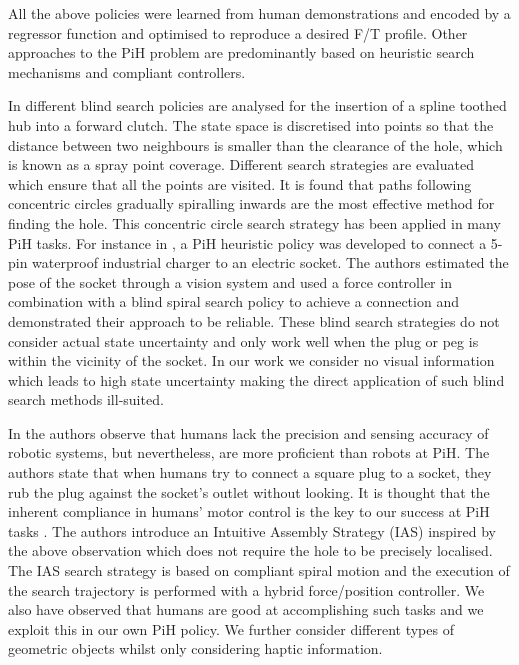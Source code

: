 All the above policies were learned from human demonstrations and encoded by a regressor function and
optimised to reproduce a desired F/T profile. Other approaches to the PiH problem 
are predominantly based on heuristic search mechanisms and compliant controllers.

In \cite{search_strategies_icra_2001} different blind search policies are analysed for the insertion of a spline toothed hub 
into a forward clutch. The state space is discretised into points so that the distance between two 
neighbours is smaller than the clearance of the hole, which is known as a spray point coverage. Different search 
strategies are evaluated which ensure that all the points are visited. It is found that paths following  
concentric circles gradually spiralling inwards are the most effective method for finding the hole. This concentric circle
search strategy has been applied in many PiH tasks. For instance in \cite{peg_imcssd_2015}, a PiH heuristic 
policy was developed to connect a 5-pin waterproof industrial charger to an electric socket. The authors 
estimated the pose of the socket through a vision system and used a force controller in combination with a 
blind spiral search policy to achieve a connection and demonstrated their approach to be reliable. 
These blind search strategies do not consider actual state uncertainty and only work well when the plug or 
peg is within the vicinity of the socket. In our work we consider no visual information which leads to 
high state uncertainty making the direct application of such blind search methods ill-suited.

In \cite{intuitive_peg_isr_2013} the authors observe that humans lack the precision and sensing 
accuracy of robotic systems, but nevertheless, are more proficient than robots at PiH. The authors state that when 
humans try to connect a square plug to a socket, they rub the plug against the socket's 
outlet without looking. It is thought that the inherent compliance in humans' motor control  
is the key to our success at PiH tasks \cite{compliant_manip_icra_2008}. 
The authors introduce an Intuitive Assembly Strategy (IAS) inspired by the above observation which 
does not require the hole to be precisely localised. The IAS search strategy is based on compliant 
spiral motion and the execution of the search trajectory is performed with a hybrid force/position controller.
We also have observed that humans are good at accomplishing such tasks and we exploit this in our own PiH policy. 
We further consider different types of geometric objects whilst only considering haptic information.

